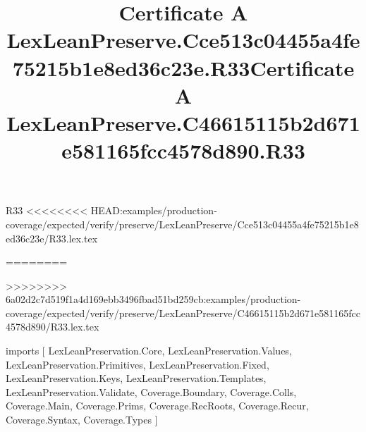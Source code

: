 \begin{lexlean}{R33}
<<<<<<<< HEAD:examples/production-coverage/expected/verify/preserve/LexLeanPreserve/Cce513c04455a4fe75215b1e8ed36c23e/R33.lex.tex
\title{Certificate A LexLeanPreserve.Cce513c04455a4fe75215b1e8ed36c23e.R33}
========
\title{Certificate A LexLeanPreserve.C46615115b2d671e581165fcc4578d890.R33}
>>>>>>>> 6a02d2c7d519f1a4d169ebb3496fbad51bd259cb:examples/production-coverage/expected/verify/preserve/LexLeanPreserve/C46615115b2d671e581165fcc4578d890/R33.lex.tex
\begin{coremodule}
imports [
  LexLeanPreservation.Core,
  LexLeanPreservation.Values,
  LexLeanPreservation.Primitives,
  LexLeanPreservation.Fixed,
  LexLeanPreservation.Keys,
  LexLeanPreservation.Templates,
  LexLeanPreservation.Validate,
  Coverage.Boundary,
  Coverage.Colls,
  Coverage.Main,
  Coverage.Prims,
  Coverage.RecRoots,
  Coverage.Recur,
  Coverage.Syntax,
  Coverage.Types
]


\end{coremodule}
\end{lexlean}
